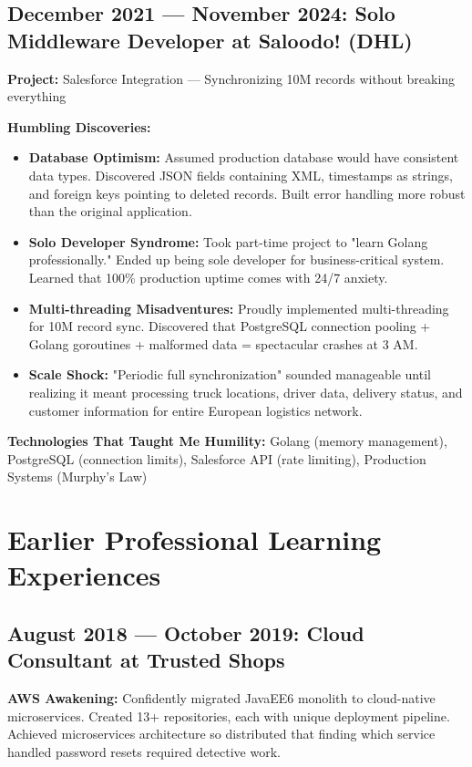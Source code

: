 \documentclass[11pt,a4paper]{article}
\begin{document}
\subsection*{December 2021 — November 2024: Solo Middleware Developer at Saloodo! (DHL)}

\textbf{Project:} Salesforce Integration — Synchronizing 10M records without breaking everything

\textbf{Humbling Discoveries:}
\begin{itemize}[leftmargin=1.5em,itemsep=0.2em]
\item \textbf{Database Optimism:} Assumed production database would have consistent data types. Discovered JSON fields containing XML, timestamps as strings, and foreign keys pointing to deleted records. Built error handling more robust than the original application.
\item \textbf{Solo Developer Syndrome:} Took part-time project to "learn Golang professionally." Ended up being sole developer for business-critical system. Learned that 100\% production uptime comes with 24/7 anxiety.
\item \textbf{Multi-threading Misadventures:} Proudly implemented multi-threading for 10M record sync. Discovered that PostgreSQL connection pooling + Golang goroutines + malformed data = spectacular crashes at 3 AM.
\item \textbf{Scale Shock:} "Periodic full synchronization" sounded manageable until realizing it meant processing truck locations, driver data, delivery status, and customer information for entire European logistics network.
\end{itemize}

\textbf{Technologies That Taught Me Humility:} Golang (memory management), PostgreSQL (connection limits), Salesforce API (rate limiting), Production Systems (Murphy's Law)

\section*{Earlier Professional Learning Experiences}

\subsection*{August 2018 — October 2019: Cloud Consultant at Trusted Shops}

\textbf{AWS Awakening:} Confidently migrated JavaEE6 monolith to cloud-native microservices. Created 13+ repositories, each with unique deployment pipeline. Achieved microservices architecture so distributed that finding which service handled password resets required detective work.
\end{document}
